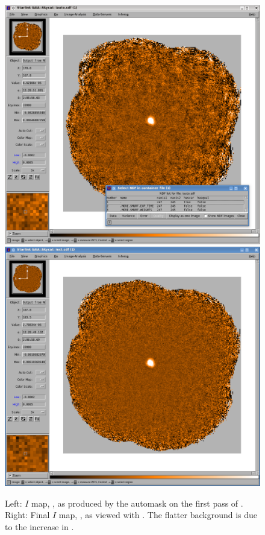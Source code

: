 \begin{figure}[t!]
\begin{center}
\includegraphics[width=0.46\linewidth]{sc22-gaia-view-iauto.png}
\includegraphics[width=0.46\linewidth]{sc22-gaia-view-iext.png}
\label{fig:gaia-iext}
\caption [Final $I$ map in GAIA]{
  \small Left: $I$ map, , as produced by the automask on the first pass
         of \poltwomap. Right: Final $I$ map, , as viewed with \GAIA.
         The flatter background is due to the increase in .
}
\end{center}
\end{figure}


